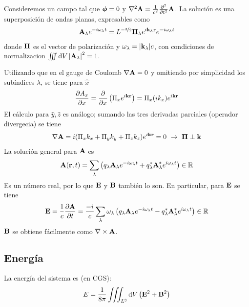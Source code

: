 Consideremos un campo tal que $\bm{\mathrm{\phi}}=0$ y $\nabla^2 \bm{\mathrm{A}}
= \frac{1}{c^2} \pdv[2]{t} \bm{\mathrm{A}}$. La solución es una
superposición de ondas planas, expresables como
\begin{equation}
  \bm{\mathrm{A}}_\lambda e^{-i\omega_\lambda t} = L^{-\nicefrac{3}{2}}
  \bm{\mathrm{\Pi}}_\lambda e^{i \bm{\mathrm{k}}_\lambda \bm{\mathrm{r}}} e^{-i
    \omega_\lambda t} 
\end{equation}
donde $\bm{\mathrm{\Pi}}$ es el vector de polarización y $\omega_\lambda =
\abs{\bm{\mathrm{k}}_\lambda}c$, con condiciones de normalizacion $\int\!\!\!\int\!\!\!\int \dd{V}
\abs{\bm{\mathrm{A}}_\lambda}^2 =1$.

Utilizando que en el gauge de Coulomb $\nabla \bm{\mathrm{A}} = 0$ y
omitiendo por simplicidad los subíndices $\lambda$, se tiene para
$\hat{x}$
\begin{equation}
  \pdv{A_x}{x} = \pdv{x} \left( \Pi_x e^{i \bm{\mathrm{k}}
      \bm{\mathrm{r}}} \right) = \Pi_x (ik_x) e^{i \bm{\mathrm{k}}\bm{\mathrm{r}}}
\end{equation}
El cálculo para $\hat{y}, \hat{z}$ es análogo; sumando las tres
derivadas parciales (operador divergecia) se tiene
\begin{equation}
  \nabla \bm{\mathrm{A}} = i (\Pi_x k_x + \Pi_y k_y + \Pi_z k_z) e^{i \bm{\mathrm{k}}\bm{\mathrm{r}}} = 0
  \ \rightarrow \ \bm{\mathrm{\Pi}} \perp \bm{\mathrm{k}}
\end{equation}
La solución general para $\bm{\mathrm{A}}$ es
\begin{equation}
  \bm{\mathrm{A}}(\bm{\mathrm{r}},t) = \sum_{\lambda} \left( q_\lambda
    \bm{\mathrm{A}}_\lambda e^{-i\omega_\lambda t} + q_\lambda^*
    \bm{\mathrm{A}}_\lambda^* e^{i \omega_\lambda t} \right) \in \mathbb{R}
  \label{eq:aform}
\end{equation}
Es un número real, por lo que $\bm{\mathrm{E}}$ y $\bm{\mathrm{B}}$ también lo
son. En particular, para $\bm{\mathrm{E}}$ se tiene
\begin{equation}
  \bm{\mathrm{E}} = \frac{1}{c} \pdv{\bm{\mathrm{A}}}{t} =
 \frac{-i}{c}\sum_{\lambda}  \omega_\lambda\left( q_\lambda
    \bm{\mathrm{A}}_\lambda e^{-i\omega_\lambda t} - q_\lambda^*
    \bm{\mathrm{A}}_\lambda^* e^{i \omega_\lambda t} \right) \in \mathbb{R}
\end{equation}
$\bm{\mathrm{B}}$ se obtiene fácilmente como $\nabla\times \bm{\mathrm{A}}$.

\subsection{Energía}

La energía del sistema es (en CGS):
\begin{equation}
  E = \frac{1}{8\pi} \int\!\!\!\int\!\!\!\int_{L^3} \dd{V} \left( \bm{\mathrm{E}}^2 + \bm{\mathrm{B}}^2 \right)
\end{equation}

